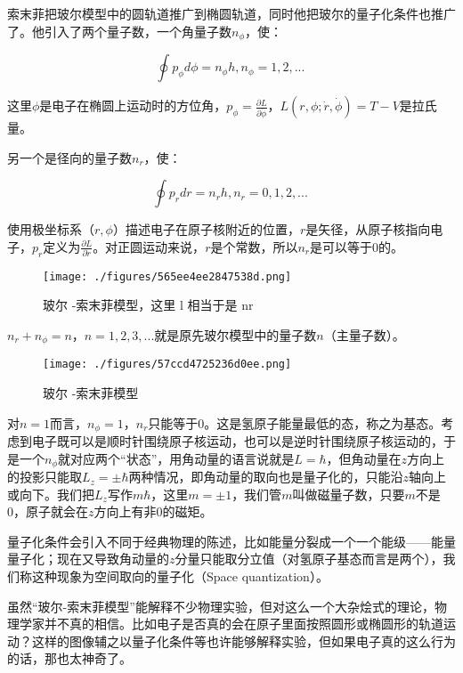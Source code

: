 索末菲把玻尔模型中的圆轨道推广到椭圆轨道，同时他把玻尔的量子化条件也推广了。他引入了两个量子数，一个角量子数$n_\phi$，使：

\begin{equation}
\oint p_\phi d \phi = n_\phi h , n_\phi = 1, 2, ...~
\end{equation}

这里$\phi$是电子在椭圆上运动时的方位角，$p_\phi = \frac{\partial L }{\partial \dot \phi }$，$L ( r, \phi; \dot r , \dot \phi  ) = T - V$是拉氏量。

另一个是径向的量子数$n_r$，使：

\begin{equation}
\oint p_r dr = n_r h , n_r = 0, 1, 2, ...~
\end{equation}

使用极坐标系（$r , \phi$）描述电子在原子核附近的位置，$r$是矢径，从原子核指向电子，$p_r$定义为$\frac{\partial L }{\partial \dot r }$。对正圆运动来说，$r$是个常数，所以$n_r$是可以等于0的。

\begin{figure}[ht]
\centering
\texttt{[image: ./figures/565ee4ee2847538d.png]}
\caption{玻尔 -索末菲模型，这里 l 相当于是 nr} \label{fig_QMPre2_15}
\end{figure}

$n_r + n_\phi = n $，$n = 1, 2, 3, ...$就是原先玻尔模型中的量子数$n$（主量子数）。

\begin{figure}[ht]
\centering
\texttt{[image: ./figures/57ccd4725236d0ee.png]}
\caption{ 玻尔 -索末菲模型} \label{fig_QMPre2_16}
\end{figure}

对$n = 1$而言，$n_\phi = 1$，$n_r$只能等于0。这是氢原子能量最低的态，称之为基态。考虑到电子既可以是顺时针围绕原子核运动，也可以是逆时针围绕原子核运动的，于是一个$n_\phi$就对应两个“状态”，用角动量的语言说就是$L = \hbar$，但角动量在$z$方向上的投影只能取$L_z = \pm \hbar $两种情况，即角动量的取向也是量子化的，只能沿$z$轴向上或向下。我们把$L_z$写作$m \hbar$，这里$m = \pm 1$，我们管$m$叫做磁量子数，只要$m$不是0，原子就会在$z$方向上有非0的磁矩。


量子化条件会引入不同于经典物理的陈述，比如能量分裂成一个一个能级——能量量子化；现在又导致角动量的$z$分量只能取分立值（对氢原子基态而言是两个），我们称这种现象为空间取向的量子化（Space quantization）。


虽然“玻尔-索末菲模型”能解释不少物理实验，但对这么一个大杂烩式的理论，物理学家并不真的相信。比如电子是否真的会在原子里面按照圆形或椭圆形的轨道运动？这样的图像辅之以量子化条件等也许能够解释实验，但如果电子真的这么行为的话，那也太神奇了。

